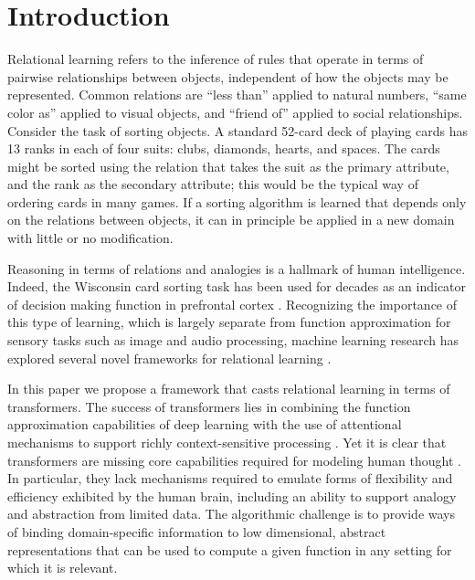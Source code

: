 \section{Introduction}
\label{sec:intro}

Relational learning refers to the inference of rules that operate in terms of pairwise relationships between 
objects, independent of how the objects may be represented. Common relations are ``less than'' applied to natural numbers, ``same color as'' applied to visual objects, and ``friend of'' applied to social relationships. Consider the task of sorting objects. A standard 52-card deck of playing cards has 13 ranks in each of four suits: clubs, diamonds, hearts, and spaces. The cards might be sorted using the relation that takes 
the suit as the primary attribute, and the rank as the secondary attribute; this would be the typical 
way of ordering cards in many games. If a sorting algorithm is learned that depends 
only on the relations between objects, it can in principle be applied in a new domain with little 
or no modification. 

Reasoning in terms of relations and analogies is a hallmark of human intelligence. 
Indeed, the Wisconsin card sorting task \citep{berg} has been used for decades as an indicator of decision making function in prefrontal cortex \citep{monchi}. Recognizing the importance of this type of learning, which is largely separate from function approximation for sensory tasks such as image and audio processing, machine learning research has explored several novel frameworks for relational learning \citep{TEM, NTM,episodicControl,esbn,mondal23learned,musslick2021rationalizing,battaglia,barrett:2018,santoro1} .

In this paper we propose a framework that casts relational learning in terms of transformers. 
The success of transformers lies in combining the function approximation capabilities of deep learning with the use of attentional mechanisms to support richly context-sensitive processing \citep{transformers,vaswani2017attention,kerg2020untangling}. Yet it is clear that transformers are missing core capabilities required for modeling human thought \citep{mahowald2023dissociating}.  In particular, they lack mechanisms required to emulate forms of flexibility and efficiency exhibited by the human brain, including an ability to support analogy and abstraction from limited data. The algorithmic challenge is to provide ways of binding domain-specific information to low dimensional, abstract representations that can be used to compute a given function in any setting for which it is relevant. 


